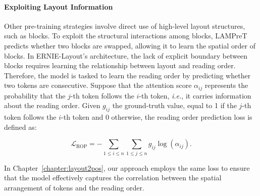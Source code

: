 \paragraph{Exploiting Layout Information}

Other pre-training strategies involve direct use of high-level layout structures, such as blocks. 
To exploit the structural interactions among blocks, \ac{LAMPreT} predicts whether two blocks are swapped, allowing it to learn the spatial order of blocks.
In ERNIE-Layout's architecture, the lack of explicit boundary between blocks requires learning the relationship between layout and reading order. Therefore, the model is tasked to learn the reading order by predicting whether two tokens are consecutive. Suppose that the attention score $\alpha_{ij}$ represents the probability that the $j$-th token follows the $i$-th token, \textit{i.e.}, it carries information about the reading order. Given $g_{ij}$ the ground-truth value, equal to 1 if the $j$-th token follows the $i$-th token and $0$ otherwise, the reading order prediction loss is defined as:

\begin{equation}
    \mathcal{L}_{\text{ROP}} = - \sum_{1 \leq i \leq n}\sum_{1 \leq j \leq n} g_{ij} \log(\alpha_{ij}).
\end{equation}

\noindent In Chapter~\ref{chapter:layout2pos}, our approach employs the same loss to ensure that the model effectively captures the correlation between the spatial arrangement of tokens and the reading order.


